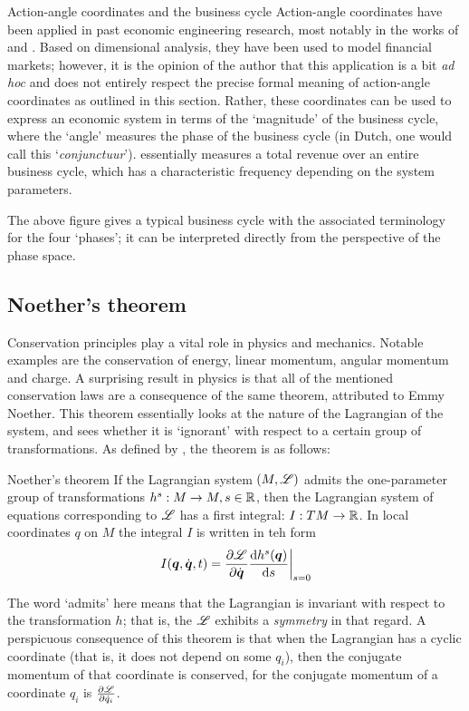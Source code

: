 \begin{econ}{Action-angle coordinates and the business cycle}
    Action-angle coordinates have been applied in past economic engineering research, most notably in the works of \citet{VanArdenne2020} and \citet{Vos2019}. Based on dimensional analysis, they have been used to model financial markets; however, it is the opinion of the author that this application is a bit \emph{ad hoc} and does not entirely respect the precise formal meaning of action-angle coordinates as outlined in this section. Rather, these coordinates can be used to express an economic system in terms of the `magnitude' of the business cycle, where the `angle' measures the phase of the business cycle (in Dutch, one would call this `\emph{conjunctuur}').  essentially measures a total revenue over an entire business cycle, which has a characteristic frequency depending on the system parameters.
    \begin{center}
        
    \end{center}
    The above figure gives a typical business cycle with the associated terminology for the four `phases'; it can be interpreted directly from the perspective of the phase space. 
\end{econ}

\subsection{Noether's theorem}
\label{ssec:noether}
Conservation principles play a vital role in physics and mechanics. Notable examples are the conservation of energy, linear momentum, angular momentum and charge. A surprising result in physics is that all of the mentioned conservation laws are a consequence of the same theorem, attributed to Emmy Noether. This theorem essentially looks at the nature of the Lagrangian of the system, and sees whether it is `ignorant' with respect to a certain group of transformations. As defined by \citet{Arnold1989}, the theorem is as follows:

\begin{thmblock}{Noether's theorem}
    If the Lagrangian system $(M, \mathscr{L})$ admits the one-parameter group of transformations $h^s: M \to M, s \in \mathbb{R}$, then the Lagrangian system of equations corresponding to $\mathscr{L}$ has a first integral: $I: TM \to \mathbb{R}$. In local coordinates $q$ on $M$ the integral $I$ is written in teh form 
    $$ \left. I(\vb*{q}, \dot{\vb*{q}}, t) = \pdv{\ensuremath{\mathscr{L}}}{\ensuremath{\dot{\vb*{q}}}}\dv{h^s(\ensuremath{\vb*{q}})}{s}\right |_{s = 0} $$
\end{thmblock}
The word `admits' here means that the Lagrangian is invariant with respect to the transformation $h$; that is, the $\mathscr{L}$ exhibits a \emph{symmetry} in that regard. A perspicuous consequence of this theorem is that when the Lagrangian has a cyclic coordinate (that is, it does not depend on some $q_i$), then the conjugate momentum of that coordinate is conserved, for the conjugate momentum of a coordinate $q_i$ is $\pdv{\ensuremath{\mathscr{L}}}{\dot{q}_i}$.


